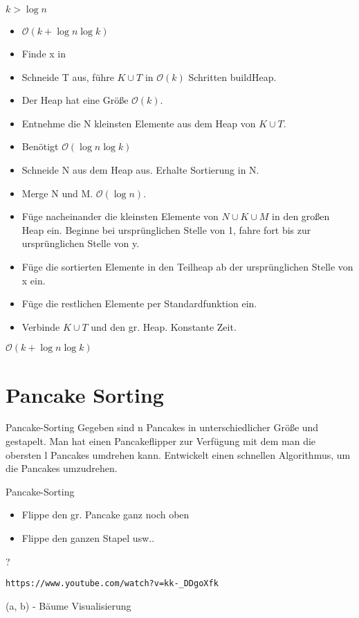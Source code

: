 \documentclass[18pt]{beamer}
\newcommand{\Oh}{\mathcal{O}}
\begin{document}
\begin{frame}{$k > \log n$}
 
 \begin{itemize}
  \item $\Oh(k + \log n \log k)$
  \item Finde x in
  \item Schneide T aus, führe $K \cup T$ in $\Oh(k)$ Schritten buildHeap.
  \item Der Heap hat eine Größe $\Oh(k)$.
  \item Entnehme die N kleinsten Elemente aus dem Heap von $K \cup T$.
  \item Benötigt $\Oh(\log n \log k)$
  \item Schneide N aus dem Heap aus. Erhalte Sortierung in N.
  \item Merge N und M. $\Oh(\log n)$.
 \item Füge nacheinander die kleinsten Elemente von $N \cup K \cup M$ in den 
 großen Heap ein. Beginne bei ursprünglichen Stelle von 1, fahre fort bis zur ursprünglichen Stelle von y.
 \item Füge die sortierten Elemente in den Teilheap ab der ursprünglichen Stelle von x ein.
 \item Füge die restlichen Elemente per Standardfunktion ein.
 \item Verbinde $K \cup T$ und den gr. Heap. Konstante Zeit.
 \end{itemize}
$\Oh(k + \log n \log k)$
\end{frame}

\section{Pancake Sorting}
\begin{frame}[fragile]{Pancake-Sorting}
 Gegeben sind n Pancakes in unterschiedlicher Größe und gestapelt. Man hat einen Pancakeflipper zur Verfügung mit dem man
 die obersten l Pancakes umdrehen kann.
 Entwickelt einen schnellen Algorithmus, um die Pancakes umzudrehen.
\end{frame}

\begin{frame}[fragile]{Pancake-Sorting}
 \begin{itemize}
  \item Flippe den gr. Pancake ganz noch oben
  \item Flippe den ganzen Stapel usw.. 
 \end{itemize}
{ \Huge ?} 
\begin{verbatim}
https://www.youtube.com/watch?v=kk-_DDgoXfk
\end{verbatim}

\end{frame}

\begin{frame}{(a, b) - Bäume}
Visualisierung
 
\end{frame}
\end{document}
